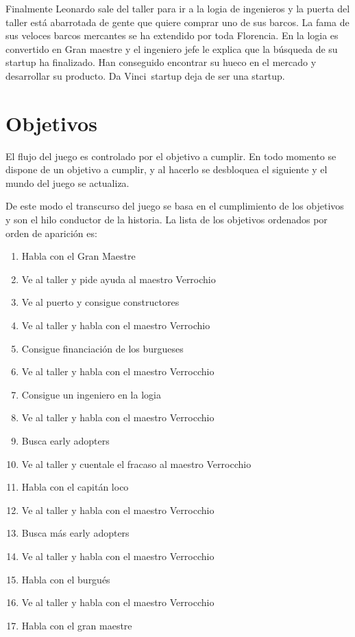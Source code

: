 {
Finalmente Leonardo sale del taller para ir a la logia de ingenieros y la puerta del taller est\'a abarrotada de gente
que quiere comprar uno de sus barcos. La fama de sus veloces barcos mercantes se ha extendido por toda Florencia. En la
logia es convertido en Gran maestre y el ingeniero jefe le explica que la b\'usqueda de su startup ha finalizado. Han
conseguido encontrar su hueco en el mercado y desarrollar su producto. Da Vinci\ startup deja de ser una startup.}

\section[Objetivos]{ Objetivos}
\hypertarget{Toc484614265}{}{
El flujo del juego es controlado por el objetivo a cumplir. En todo momento se dispone de un objetivo a cumplir, y al
hacerlo se desbloquea el siguiente y el mundo del juego se actualiza.}

{
De este modo el transcurso del juego se basa en el cumplimiento de los objetivos y son el hilo conductor de la historia.
La lista de los objetivos ordenados por orden de aparici\'on es:}

\liststyleLFOxii
\setcounter{saveenum}{\value{enumi}}
\begin{enumerate}
\setcounter{enumi}{\value{saveenum}}
\item {
Habla con el Gran Maestre}
\item {
Ve al taller y pide ayuda al maestro Verrochio\ \ }
\item {
Ve al puerto y consigue constructores}
\item {
Ve al taller y habla con el maestro Verrochio}
\item {
Consigue financiaci\'on de los burgueses}
\item {
Ve al taller y habla con el maestro Verrocchio}
\item {
Consigue un ingeniero en la logia}
\item {
Ve al taller y habla con el maestro Verrocchio}
\item {
Busca early adopters}
\item {
Ve al taller y cuentale el fracaso al maestro Verrocchio}
\item {
Habla con el capit\'an loco}
\item {
Ve al taller y habla con el maestro Verrocchio}
\item {
Busca m\'as early adopters}
\item {
Ve al taller y habla con el maestro Verrocchio}
\item {
Habla con el burgu\'es}
\item {
Ve al taller y habla con el maestro Verrocchio}
\item {
Habla con el gran maestre}
\end{enumerate}
